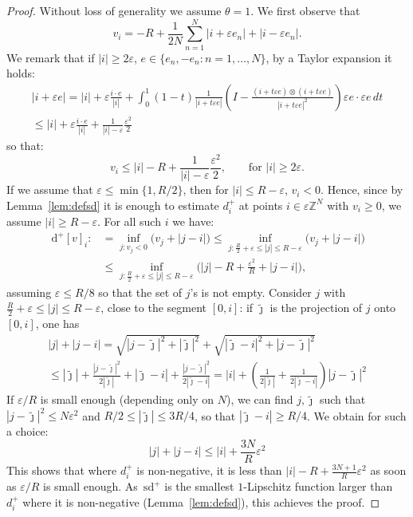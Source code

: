 \documentclass[10pt,a4paper]{amsart}
\newcommand{\Z}{\mathbb{Z}}
\newcommand{\e}{\varepsilon}
\newcommand{\ez}{\e\Z^N}
\newcommand{\sd}{\,\mathrm{sd}}
\newcommand{\ud}{\,\mathrm{d}}
\begin{document}
\begin{proof}
  Without loss of generality we assume $\theta=1$. 
  We first observe that
  \[
    v_i = -R + \frac{1}{2N}\sum_{n=1}^N |i+\e e_n|+ |i-\e e_n|.
  \]
  We remark that if $|i|\ge 2\e$, $e\in\{e_n,-e_n:n= 1,\dots ,N\}$,
   {by a   Taylor expansion it holds:}
  \begin{multline}\label{eq:Taylor}
    |i+\e e| = |i| + \e\frac{i\cdot e}{|i|} +
    \int_0^1 (1-t) \frac{1}{|i+t\e e|}\left(I - \frac{(i+t\e e)\otimes (i+t\e e)}{|i+t\e e|^2}
    \right)\e e \cdot \e e\,dt  \\ 
    \le  |i| + \e\frac{i\cdot e}{|i|} + \frac{1}{|i|-\e}\frac{\e^2}{2}
  \end{multline}
  so that:
  \[
    v_i \le |i|-R + \frac{1}{|i|-\e}\frac{\e^2}{2}, \qquad  {\text{for } |i|\ge 2\e}.
  \]
  If we assume that $\e\le \min\{1,R/2\}$, then for $|i|\le R-\e$,
  $v_i< 0$. Hence, since by Lemma~\ref{lem:defsd}
  it is enough
  to estimate $d_i^+$ at points
  $i\in\ez$ with $v_i\ge 0$, we assume  $|i|\ge R-\e$. For all such $i$ we have:
  \begin{equation}
  \begin{split}\label{eq:d+est}
      \ud^+[v]_i :&= \inf_{j:v_j<0}  {(} v_j + |j-i|  {)}
    \le \inf_{j: \frac{R}{2}+\e\le |j|\le R-\e}  {(} v_j + |j-i|  {)} \\
    &\le \inf_{j: \frac{R}{2}+\e \le |j|\le R-\e}  {(} |j|-R + \frac{\e^2}{R} + |j-i|  ),
  \end{split}
  \end{equation}
  assuming $\e\le R/8$ so that the set of $j$'s is not empty.
  Consider $j$ with $\frac{R}{2}+\e \le |j|\le R-\e$, close to the
  segment $[0,i]$:  if $\tilde{\jmath}$ is the projection of $j$ onto $[0,i]$, one has
  \begin{multline*}
    |j|+|j-i| =  \sqrt{ |j-\tilde{\jmath}|^2 +|\tilde{\jmath}|^2} + \sqrt{|\tilde{\jmath}-i|^2+|j-\tilde{\jmath}|^2}
    \\
    \le |\tilde{\jmath}| + \frac{|j-\tilde{\jmath}|^2 }{2|\tilde{\jmath}|}
    + |\tilde{\jmath}-i| + \frac{|j-\tilde{\jmath}|^2 }{2|\tilde{\jmath}-i|}
    = |i| + \left(\frac{1}{2|\tilde{\jmath}|} + \frac{1}{2|\tilde{\jmath}-i|} \right){|j-\tilde{\jmath}|^2 }
  \end{multline*}
  If $\e/R$ is small enough (depending only on $N$), we can find
  $j,\tilde{\jmath}$ such that $|j-\tilde{\jmath}|^2\le N\e^2$ and $R/2\le |\tilde{\jmath}|\le 3R/4$,
  so that $|\tilde{\jmath}-i|\ge R/4$. We obtain for such a choice:
\begin{equation}\label{eq:triangle}
    |j|+|j-i| \le |i|+\frac{3N}{R}\e^2
\end{equation}
  This shows that where $d^+_i$ is non-negative, it is
  less than $|i|-R + \frac{3N+1}{R}\e^2$ as soon as $\e/R$ is small enough. As $\sd^+$ is the smallest
  $1$-Lipschitz function larger than $d^+_i$ where it is non-negative (Lemma~\ref{lem:defsd}),
  this achieves the proof.
\end{proof}
\end{document}
